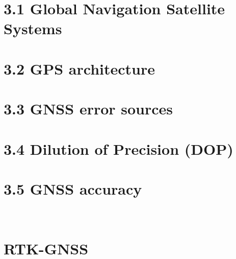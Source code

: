 \begin{multicols}{2}
\section{3.1 Global Navigation Satellite Systems}



\section{3.2 GPS architecture}



\section{3.3 GNSS error sources}


\section{3.4 Dilution of Precision (DOP)}


\section{3.5 GNSS accuracy}\\



\section{RTK-GNSS}

\end{multicols}
